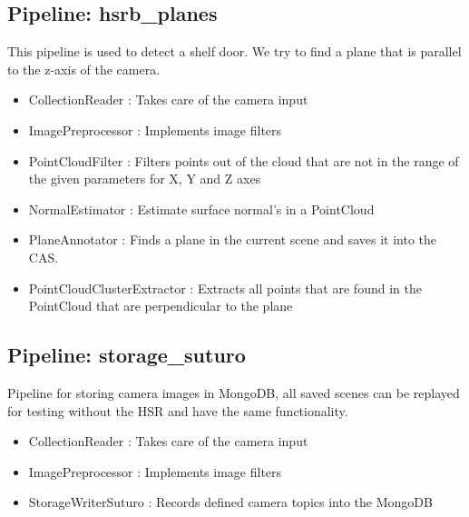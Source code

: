 \documentclass[main.tex]{subfiles}
\begin{document}
			\subsection{Pipeline: hsrb\_planes} 
This pipeline is used to detect a shelf door. We try to find a plane that is parallel to the z-axis of the camera.
\begin{itemize}
	\item CollectionReader : Takes care of the camera input
	\item ImagePreprocessor : Implements image filters  
	\item PointCloudFilter : Filters points out of the cloud that are not in the range of the given parameters for X, Y and Z axes
	\item NormalEstimator : Estimate surface normal's in a PointCloud 
	\item PlaneAnnotator : Finds a plane in the current scene and saves it into the CAS.
	\item PointCloudClusterExtractor : Extracts all points that are found in the PointCloud that are perpendicular to the plane 
\end{itemize}

			\subsection{Pipeline: storage\_suturo} 
Pipeline for storing camera images in MongoDB, all saved scenes can be replayed for testing without the HSR and have the same functionality. 
\begin{itemize}
	\item CollectionReader : Takes care of the camera input
	\item ImagePreprocessor : Implements image filters 
	\item StorageWriterSuturo :  Records defined camera topics into the MongoDB
\end{itemize}
\end{document}

